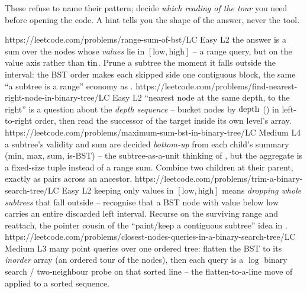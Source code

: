 These refuse to name their pattern; decide \emph{which reading of the tour} you need before
opening the code. A hint tells you the shape of the answer, never the tool.

\begin{mixedset}
    {https://leetcode.com/problems/range-sum-of-bst/}{LC Easy L2}
    {the answer is a sum over the nodes whose \emph{values} lie in $[\text{low},\text{high}]$
    -- a range query, but on the value axis rather than $\operatorname{tin}$. Prune a subtree the moment it
    falls outside the interval: the BST order makes each skipped side one contiguous block,
    the same ``a subtree is a range'' economy as .}
    {https://leetcode.com/problems/find-nearest-right-node-in-binary-tree/}{LC Easy L2}
    {``nearest node at the same depth, to the right'' is a question about the \emph{depth
    sequence} -- bucket nodes by $\operatorname{depth}$ () in left-to-right order, then read
    the successor of the target inside its own level's array.}
    {https://leetcode.com/problems/maximum-sum-bst-in-binary-tree/}{LC Medium L4}
    {a subtree's validity and sum are decided \emph{bottom-up} from each child's summary
    (min, max, sum, is-BST) -- the subtree-as-a-unit thinking of , but the
    aggregate is a fixed-size tuple instead of a range sum. Combine two children at their
    parent, exactly as  pairs across an ancestor.}
    {https://leetcode.com/problems/trim-a-binary-search-tree/}{LC Easy L2}
    {keeping only values in $[\text{low},\text{high}]$ means \emph{dropping whole subtrees} that
    fall outside -- recognise that a BST node with value below $\text{low}$ carries an entire
    discarded left interval. Recurse on the surviving range and reattach, the pointer cousin of
    the ``paint/keep a contiguous subtree'' idea in .}
    {https://leetcode.com/problems/closest-nodes-queries-in-a-binary-search-tree/}{LC Medium L3}
    {many point queries over one ordered tree: flatten the BST to its \emph{inorder} array
    (an ordered tour of the nodes), then each query is a $\log$ binary search / two-neighbour
    probe on that sorted line -- the flatten-to-a-line move of  applied to
    a sorted sequence.}

\end{mixedset}
